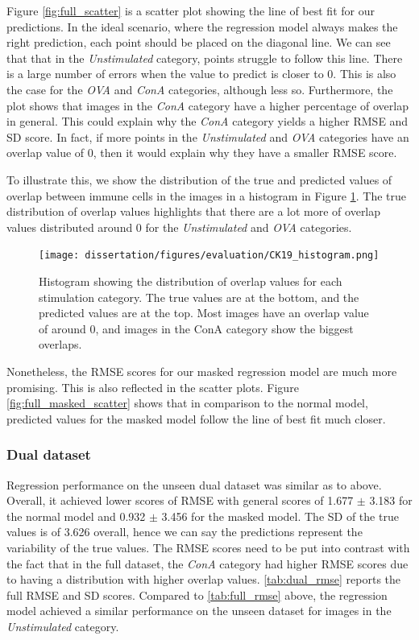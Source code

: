 Figure \ref{fig:full_scatter} is a scatter plot showing the line of best fit for our predictions. In the ideal scenario, where the regression model always makes the right prediction, each point should be placed on the diagonal line. We can see that that in the \textit{Unstimulated} category, points struggle to follow this line. There is a large number of errors when the value to predict is closer to 0. This is also the case for the \textit{OVA} and \textit{ConA} categories, although less so. Furthermore, the plot shows that images in the \textit{ConA} category have a higher percentage of overlap in general. This could explain why the \textit{ConA} category yields a higher RMSE and SD score. In fact, if more points in the \textit{Unstimulated} and \textit{OVA} categories have an overlap value of 0, then it would explain why they have a smaller RMSE score.

To illustrate this, we show the distribution of the true and predicted values of overlap between immune cells in the images in a histogram in Figure \ref{fig:full_histogram}. The true distribution of overlap values highlights that there are a lot more of overlap values distributed around 0 for the \textit{Unstimulated} and \textit{OVA} categories.

\begin{figure}[h!]
    \centering
    \texttt{[image: dissertation/figures/evaluation/CK19\_histogram.png]}
    \caption{Histogram showing the distribution of overlap values for each stimulation category. The true values are at the bottom, and the predicted values are at the top. Most images have an overlap value of around 0, and images in the ConA category show the biggest overlaps.}
    \label{fig:full_histogram}
\end{figure}

Nonetheless, the RMSE scores for our masked regression model are much more promising. This is also reflected in the scatter plots. Figure \ref{fig:full_masked_scatter} shows that in comparison to the normal model, predicted values for the masked model follow the line of best fit much closer.

\bigskip
\subsubsection{Dual dataset}
\hfill
\hfill

Regression performance on the unseen dual dataset was similar as to above. Overall, it achieved lower scores of RMSE with general scores of 1.677 $\pm$ 3.183 for the normal model and 0.932 $\pm$ 3.456 for the masked model. The SD of the true values is of 3.626 overall, hence we can say the predictions represent the variability of the true values. The RMSE scores need to be put into contrast with the fact that in the full dataset, the \textit{ConA} category had higher RMSE scores due to having a distribution with higher overlap values. \autoref{tab:dual_rmse} reports the full RMSE and SD scores. Compared to \autoref{tab:full_rmse} above, the regression model achieved a similar performance on the unseen dataset for images in the \textit{Unstimulated} category.

